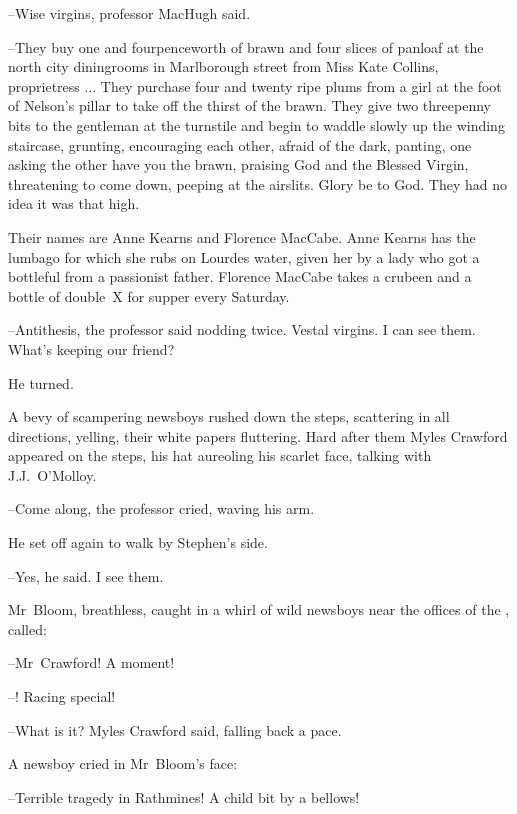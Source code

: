 --Wise virgins,
professor MacHugh said.



--They buy one and fourpenceworth of brawn
and four slices of panloaf
at the north city diningrooms in Marlborough street
from Miss Kate Collins, proprietress ...
They purchase four and twenty ripe plums
from a girl at the foot of Nelson's pillar
to take off the thirst of the brawn.
They give two threepenny bits to the gentleman at the turnstile
and begin to waddle slowly up the winding staircase,
grunting,
encouraging each other,
afraid of the dark,
panting,
one asking the other
have you the brawn,
praising
God and the Blessed Virgin,
threatening to come down,
peeping at the airslits.
Glory be to God.
They had no idea it was that high.

Their names are Anne Kearns and Florence MacCabe.
Anne Kearns has the lumbago for which she rubs on Lourdes water,
given her by a lady
who got a bottleful from a passionist father.
Florence MacCabe takes a crubeen and a bottle of double~X for supper every Saturday.

--Antithesis,
the professor said nodding twice.
Vestal virgins.
I can see them.
What's keeping our friend?

He turned.

A bevy of scampering newsboys rushed down the steps,
scattering in all directions, yelling,
their white papers fluttering.
Hard after them Myles Crawford appeared on the steps,
his hat aureoling his scarlet face,
talking with J.J.~O'Molloy.

--Come along,
the professor cried,
waving his arm.

He set off again to walk by Stephen's side.



--Yes,
he said.
I see them.

Mr~Bloom,
breathless,
caught in a whirl of wild newsboys
near the offices of the ,
called:

--Mr~Crawford!
A moment!

--!
Racing special!

--What is it?
Myles Crawford said,
falling back a pace.

A newsboy cried in Mr~Bloom's face:

--Terrible tragedy in Rathmines!
A child bit by a bellows!




